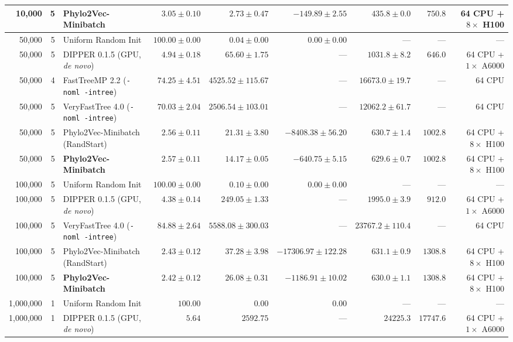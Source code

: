 \begin{table}[!htbp]
{\begin{tabular}{@{}rrlrrrrrr@{}}
10,000 & 5 & \textbf{Phylo2Vec-Minibatch} & $3.05 \pm 0.10$ & $\mathbf{2.73 \pm 0.47}$ & $-149.89 \pm 2.55$ & $435.8 \pm 0.0$ & $750.8$ & 64 CPU + $8\times$ H100\\
\midrule
50,000 & 5 & Uniform Random Init & $100.00 \pm 0.00$ & $0.04 \pm 0.00$ & $0.00 \pm 0.00$ & --- & --- & ---\\
50,000 & 5 & DIPPER 0.1.5 (GPU, \textit{de novo}) & $4.94 \pm 0.18$ & $65.60 \pm 1.75$ & --- & $1031.8 \pm 8.2$ & $646.0$ & 64 CPU + $1\times$ A6000\\
50,000 & 4 & FastTreeMP 2.2 (\texttt{-noml -intree}) & $74.25 \pm 4.51$ & $4525.52 \pm 115.67$ & --- & $16673.0 \pm 19.7$ & --- & 64 CPU\\
50,000 & 5 & VeryFastTree 4.0 (\texttt{-noml -intree}) & $70.03 \pm 2.04$ & $2506.54 \pm 103.01$ & --- & $12062.2 \pm 61.7$ & --- & 64 CPU\\
50,000 & 5 & Phylo2Vec-Minibatch (RandStart) & $\mathbf{2.56 \pm 0.11}$ & $21.31 \pm 3.80$ & $-8408.38 \pm 56.20$ & $630.7 \pm 1.4$ & $1002.8$ & 64 CPU + $8\times$ H100\\
50,000 & 5 & \textbf{Phylo2Vec-Minibatch} & $2.57 \pm 0.11$ & $\mathbf{14.17 \pm 0.05}$ & $-640.75 \pm 5.15$ & $\mathbf{629.6 \pm 0.7}$ & $1002.8$ & 64 CPU + $8\times$ H100\\
\midrule
100,000 & 5 & Uniform Random Init & $100.00 \pm 0.00$ & $0.10 \pm 0.00$ & $0.00 \pm 0.00$ & --- & --- & ---\\
100,000 & 5 & DIPPER 0.1.5 (GPU, \textit{de novo}) & $4.38 \pm 0.14$ & $249.05 \pm 1.33$ & --- & $1995.0 \pm 3.9$ & $912.0$ & 64 CPU + $1\times$ A6000\\
100,000 & 5 & VeryFastTree 4.0 (\texttt{-noml -intree}) & $84.88 \pm 2.64$ & $5588.08 \pm 300.03$ & --- & $23767.2 \pm 110.4$ & --- & 64 CPU\\
100,000 & 5 & Phylo2Vec-Minibatch (RandStart) & $2.43 \pm 0.12$ & $37.28 \pm 3.98$ & $-17306.97 \pm 122.28$ & $631.1 \pm 0.9$ & $1308.8$ & 64 CPU + $8\times$ H100\\
100,000 & 5 & \textbf{Phylo2Vec-Minibatch} & $\mathbf{2.42 \pm 0.12}$ & $\mathbf{26.08 \pm 0.31}$ & $-1186.91 \pm 10.02$ & $\mathbf{630.0 \pm 1.1}$ & $1308.8$ & 64 CPU + $8\times$ H100\\
\midrule
1,000,000 & 1 & Uniform Random Init & $100.00$ & $0.00$ & $0.00$ & --- & --- & ---\\
1,000,000 & 1 & DIPPER 0.1.5 (GPU, \textit{de novo}) & $5.64$ & $2592.75$ & --- & $24225.3$ & $17747.6$ & 64 CPU + $1\times$ A6000\\

\end{tabular}}
\end{table}
